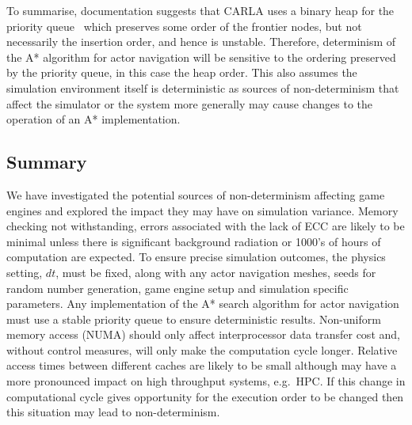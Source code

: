 To summarise, documentation suggests that CARLA uses a binary heap for the priority queue~\cite{FGraphAStar,TArray,GraphAStar} which preserves some order of the frontier nodes, but not necessarily the insertion order, and hence is unstable. Therefore, determinism of the A* algorithm for actor navigation will be sensitive to the ordering preserved by the priority queue, in this case the heap order. This also assumes the simulation environment itself is deterministic as sources of non-determinism that affect the simulator or the system more generally may cause changes to the operation of an A* implementation.





\subsection{Summary}
We have investigated the potential sources of non-determinism affecting game engines and explored the impact they may have on simulation variance. Memory checking not withstanding, errors associated with the lack of ECC are likely to be minimal unless there is significant background radiation or 1000's of hours of computation are expected. To ensure precise simulation outcomes, the physics setting, $dt$, must be fixed, along with any actor navigation meshes, seeds for random number generation, game engine setup and simulation specific parameters. %
%
Any implementation of the A* search algorithm for actor navigation must use a stable priority queue to ensure deterministic results. 
%
Non-uniform memory access (NUMA) should only affect interprocessor data transfer cost and, without control measures, will only make the computation cycle longer. Relative access times between different caches are likely to be small although may have a more pronounced impact on high throughput systems, e.g.\ HPC. If this change in computational cycle gives opportunity for the execution order to be changed then this situation may lead to non-determinism. 

